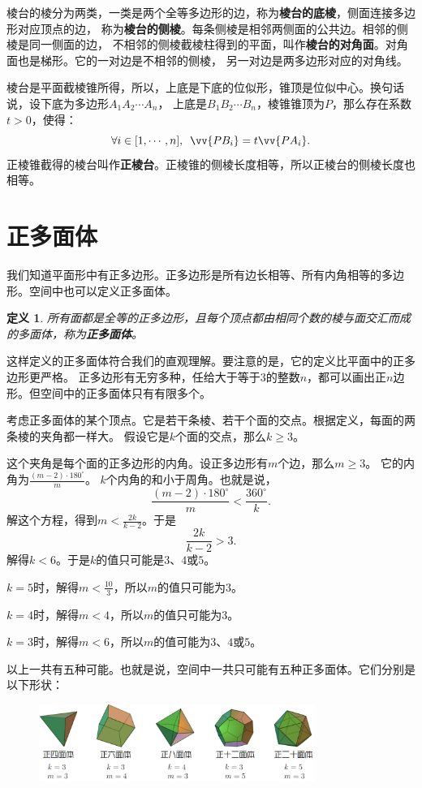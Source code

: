 \documentclass[12pt,UTF8]{ctexbook}
\newtheorem{df}{定义}[section]
\begin{document}
棱台的棱分为两类，一类是两个全等多边形的边，称为\textbf{棱台的底棱}，侧面连接多边形对应顶点的边，
称为\textbf{棱台的侧棱}。每条侧棱是相邻两侧面的公共边。相邻的侧棱是同一侧面的边，
不相邻的侧棱截棱柱得到的平面，叫作\textbf{棱台的对角面}。对角面也是梯形。它的一对边是不相邻的侧棱，
另一对边是两多边形对应的对角线。

棱台是平面截棱锥所得，所以，上底是下底的位似形，锥顶是位似中心。换句话说，设下底为多边形$A_1A_2\cdots A_n$，
上底是$B_1B_2\cdots B_n$，棱锥锥顶为$P$，那么存在系数$t>0$，使得：
$$\forall i\in[1,\cdots ,n],\,\,\,\vv{PB_i} = t\vv{PA_i}.$$
正棱锥截得的棱台叫作\textbf{正棱台}。正棱锥的侧棱长度相等，所以正棱台的侧棱长度也相等。

\section{正多面体}
我们知道平面形中有正多边形。正多边形是所有边长相等、所有内角相等的多边形。空间中也可以定义正多面体。

\begin{df}
    所有面都是全等的正多边形，且每个顶点都由相同个数的棱与面交汇而成的多面体，称为\textbf{正多面体}。
\end{df}

这样定义的正多面体符合我们的直观理解。要注意的是，它的定义比平面中的正多边形更严格。
正多边形有无穷多种，任给大于等于$3$的整数$n$，都可以画出正$n$边形。但空间中的正多面体只有有限多个。

考虑正多面体的某个顶点。它是若干条棱、若干个面的交点。根据定义，每面的两条棱的夹角都一样大。
假设它是$k$个面的交点，那么$k \geqslant 3$。

这个夹角是每个面的正多边形的内角。设正多边形有$m$个边，那么$m \geqslant 3$。
它的内角为$\frac{(m - 2)\cdot 180^\circ}{m}$。
$k$个内角的和小于周角。也就是说，
$$ \frac{(m - 2)\cdot 180^\circ}{m} < \frac{360^\circ}{k}.$$
解这个方程，得到$m < \frac{2k}{k - 2}$。于是
$$ \frac{2k}{k - 2} > 3.$$
解得$k < 6$。于是$k$的值只可能是$3$、$4$或$5$。

$k = 5$时，解得$m < \frac{10}{3}$，所以$m$的值只可能为$3$。

$k = 4$时，解得$m < 4$，所以$m$的值只可能为$3$。

$k = 3$时，解得$m < 6$，所以$m$的值可能为$3$、$4$或$5$。

以上一共有五种可能。也就是说，空间中一共只可能有五种正多面体。它们分别是以下形状：

\begin{figure}[h]
    \vspace{4pt}
    \centering
    \includegraphics[width=0.8\textwidth]{tu/正多面体1.png}
    \captionsetup{justification=centering}
\end{figure}
\end{document}
